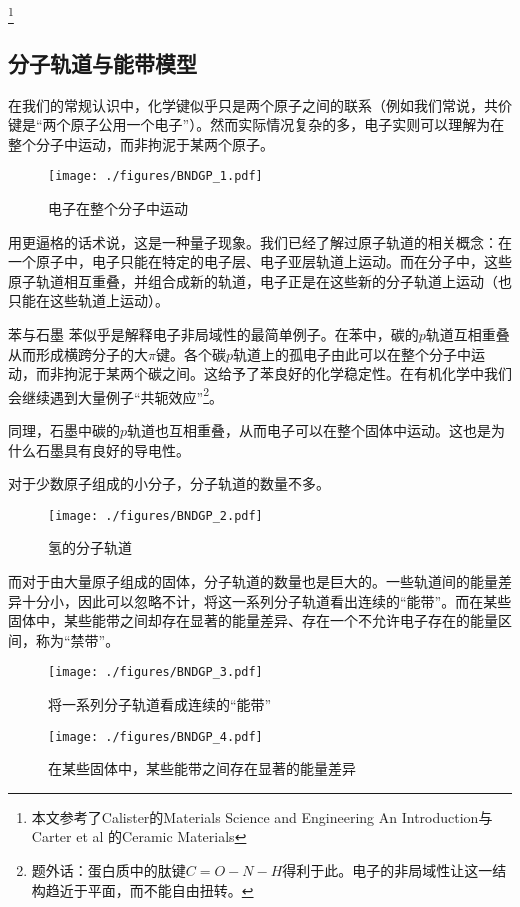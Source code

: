 
\begin{issues}
\issueDraft
\end{issues}


\footnote{本文参考了Calister的Materials Science and Engineering An Introduction与Carter et al 的Ceramic Materials}
\subsection{分子轨道与能带模型}
在我们的常规认识中，化学键似乎只是两个原子之间的联系（例如我们常说，共价键是“两个原子公用一个电子”）。然而实际情况复杂的多，电子实则可以理解为在整个分子中运动，而非拘泥于某两个原子。
\begin{figure}[ht]
\centering
\texttt{[image: ./figures/BNDGP\_1.pdf]}
\caption{电子在整个分子中运动} \label{BNDGP_fig1}
\end{figure}
用更逼格的话术说，这是一种量子现象。我们已经了解过原子轨道的相关概念：在一个原子中，电子只能在特定的电子层、电子亚层轨道上运动。而在分子中，这些原子轨道相互重叠，并组合成新的轨道，电子正是在这些新的分子轨道上运动（也只能在这些轨道上运动）。

\begin{example}{苯与石墨}
苯似乎是解释电子非局域性的最简单例子。在苯中，碳的$p$轨道互相重叠从而形成横跨分子的大$\pi$键。各个碳$p$轨道上的孤电子由此可以在整个分子中运动，而非拘泥于某两个碳之间。这给予了苯良好的化学稳定性。在有机化学中我们会继续遇到大量例子“共轭效应”\footnote{题外话：蛋白质中的肽键$C=O-N-H$得利于此。电子的非局域性让这一结构趋近于平面，而不能自由扭转。}。

同理，石墨中碳的$p$轨道也互相重叠，从而电子可以在整个固体中运动。这也是为什么石墨具有良好的导电性。
\end{example}

对于少数原子组成的小分子，分子轨道的数量不多。
\begin{figure}[ht]
\centering
\texttt{[image: ./figures/BNDGP\_2.pdf]}
\caption{氢的分子轨道} \label{BNDGP_fig2}
\end{figure}
而对于由大量原子组成的固体，分子轨道的数量也是巨大的。一些轨道间的能量差异十分小，因此可以忽略不计，将这一系列分子轨道看出连续的“能带”。而在某些固体中，某些能带之间却存在显著的能量差异、存在一个不允许电子存在的能量区间，称为“禁带”。
\begin{figure}[ht]
\centering
\texttt{[image: ./figures/BNDGP\_3.pdf]}
\caption{将一系列分子轨道看成连续的“能带”} \label{BNDGP_fig3}
\end{figure}
\begin{figure}[ht]
\centering
\texttt{[image: ./figures/BNDGP\_4.pdf]}
\caption{在某些固体中，某些能带之间存在显著的能量差异} \label{BNDGP_fig4}
\end{figure}

